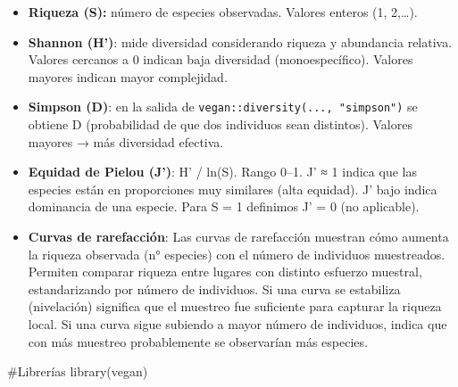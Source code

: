 \documentclass[
  spanish,
  11pt,
  a4paper,
  DIV=11,
  numbers=noendperiod]{scrartcl}
\newenvironment{Shaded}{\begin{snugshade}}{\end{snugshade}}
\newcommand{\CommentTok}[1]{\textcolor[rgb]{0.37,0.37,0.37}{#1}}
\newcommand{\FunctionTok}[1]{\textcolor[rgb]{0.28,0.35,0.67}{#1}}
\newcommand{\NormalTok}[1]{\textcolor[rgb]{0.00,0.23,0.31}{#1}}
\begin{document}
\begin{itemize}
\item
  \textbf{Riqueza (S):} número de especies observadas. Valores enteros
  (1, 2,\ldots).
\item
  \textbf{Shannon (H')}: mide diversidad considerando riqueza y
  abundancia relativa. Valores cercanos a 0 indican baja diversidad
  (monoespecífico). Valores mayores indican mayor complejidad.
\item
  \textbf{Simpson (D)}: en la salida de
  \texttt{vegan::diversity(...,\ "simpson")} se obtiene D (probabilidad
  de que dos individuos sean distintos). Valores mayores → más
  diversidad efectiva.
\item
  \textbf{Equidad de Pielou (J')}: H' / ln(S). Rango 0--1. J' ≈ 1 indica
  que las especies están en proporciones muy similares (alta equidad).
  J' bajo indica dominancia de una especie. Para S = 1 definimos J' = 0
  (no aplicable).
\item
  \textbf{Curvas de rarefacción}: Las curvas de rarefacción muestran
  cómo aumenta la riqueza observada (n° especies) con el número de
  individuos muestreados. Permiten comparar riqueza entre lugares con
  distinto esfuerzo muestral, estandarizando por número de individuos.
  Si una curva se estabiliza (nivelación) significa que el muestreo fue
  suficiente para capturar la riqueza local. Si una curva sigue subiendo
  a mayor número de individuos, indica que con más muestreo
  probablemente se observarían más especies.
\end{itemize}

\begin{Shaded}
\begin{Highlighting}[numbers=left,,]
\CommentTok{\#Librerías}
\FunctionTok{library}\NormalTok{(vegan)}
\end{Highlighting}
\end{Shaded}
\end{document}
